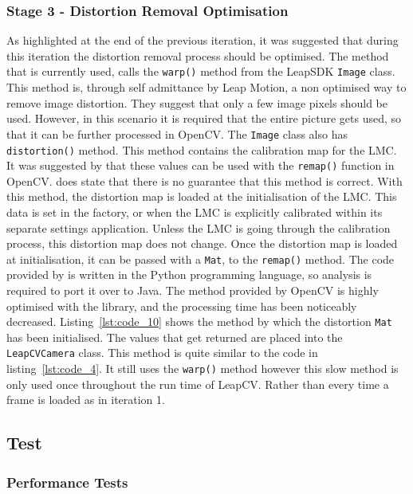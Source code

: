 \documentclass[11pt,oneside]{report}
\newcommand\code[1]{\texttt{#1}}
\begin{document}
		\subsubsection{Stage 3 - Distortion Removal Optimisation}
			As highlighted at the end of the previous iteration, it was suggested that during this iteration the distortion removal process should be optimised.
			The method that is currently used, calls the \code{warp()} method from the LeapSDK \code{Image} class.
			This method is, through self admittance by Leap Motion, a non optimised way to remove image distortion.
			They suggest that only a few image pixels should be used.
			However, in this scenario it is required that the entire picture gets used, so that it can be further processed in OpenCV.
			The \code{Image} class also has \code{distortion()} method.
			This method contains the calibration map for the LMC.
			It was suggested by  that these values can be used with the \code{remap()} function in OpenCV.
			 does state that there is no guarantee that this method is correct.
			With this method, the distortion map is loaded at the initialisation of the LMC.
			This data is set in the factory, or when the LMC is explicitly calibrated within its separate settings application.
			Unless the LMC is going through the calibration process, this distortion map does not change.
			Once the distortion map is loaded at initialisation, it can be passed with a \code{Mat}, to the \code{remap()} method.
			The code provided by  is written in the Python programming language, so analysis is required to port it over to Java.
			The method provided by OpenCV is highly optimised with the library, and the processing time has been noticeably decreased.
			Listing~\ref{lst:code_10} shows the method by which the distortion \code{Mat} has been initialised.
			The values that get returned are placed into the \code{LeapCVCamera} class.
			This method is quite similar to the code in listing~\ref{lst:code_4}.
			It still uses the \code{warp()} method however this slow method is only used once throughout the run time of LeapCV.
			Rather than every time a frame is loaded as in iteration 1.
			
		\subsection{Test}
			\subsubsection{Performance Tests}
			
			
\end{document}

